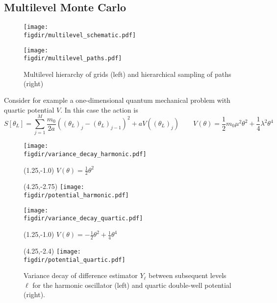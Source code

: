 \documentclass[11pt]{article}
\newcommand{\figdir}{./figures/}
\begin{document}
\subsection{Multilevel Monte Carlo}
\begin{figure}
  \begin{center}
  \begin{minipage}{0.55\linewidth}
    \texttt{[image: \\figdir/multilevel\_schematic.pdf]}
  \end{minipage}
  \hfill
  \begin{minipage}{0.4\linewidth}
    \texttt{[image: \\figdir/multilevel\_paths.pdf]}
  \end{minipage}
  \caption{Multilevel hierarchy of grids (left) and hierarchical sampling of paths (right)}
  \end{center}
\end{figure}
Consider for example a one-dimensional quantum mechanical problem with quartic potential $V$. In this case the action is
\begin{equation}
  S\left[\theta_L\right] = \sum_{j=1}^M \frac{m_0}{2a}\left((\theta_L)_j-(\theta_L)_{j-1}\right)^2 + aV\left((\theta_L)_j\right)\qquad V(\theta) = \frac{1}{2}m_0\mu^2\theta^2+\frac{1}{4}\lambda^2\theta^4
\end{equation}
\begin{figure}
  \begin{center}
  \begin{minipage}{0.45\linewidth}
    \texttt{[image: \\figdir/variance\_decay\_harmonic.pdf]}
    \begin{textblock}{4.0}(1.25,-1.0)
      $V(\theta)=\frac{1}{2}\theta^2$
    \end{textblock}
    \begin{textblock}{4.0}(4.25,-2.75)
      \texttt{[image: \\figdir/potential\_harmonic.pdf]}
    \end{textblock}
  \end{minipage}
  \hfill
  \begin{minipage}{0.45\linewidth}
    \texttt{[image: \\figdir/variance\_decay\_quartic.pdf]}
    \begin{textblock}{4.0}(1.25,-1.0)
      $V(\theta)=-\frac{1}{2}\theta^2+\frac{1}{4}\theta^4$
    \end{textblock}
    \begin{textblock}{4.0}(4.25,-2.4)
      \texttt{[image: \\figdir/potential\_quartic.pdf]}
    \end{textblock}
  \end{minipage}
  \caption{Variance decay of difference estimator $Y_\ell$ between subsequent levels $\ell$ for the harmonic oscillator (left) and quartic double-well potential (right).}
  \end{center}
\end{figure}
\end{document}
